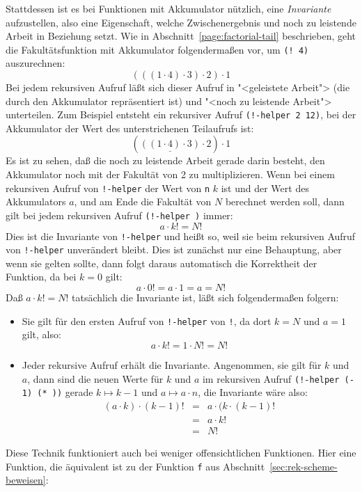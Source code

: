 Stattdessen ist es bei Funktionen mit Akkumulator nützlich, eine
\textit{Invariante} aufzustellen, also eine
Eigenschaft, welche Zwischenergebnis und noch zu leistende Arbeit in
Beziehung setzt.  Wie in Abschnitt~\ref{page:factorial-tail}
beschrieben, geht die Fakultätsfunktion mit Akkumulator folgendermaßen
vor, um \texttt{(! 4)} auszurechnen:
%
\begin{displaymath}
  (((1 \cdot 4)\cdot 3)\cdot 2)\cdot 1
\end{displaymath}
%
Bei jedem rekursiven Aufruf läßt sich dieser Aufruf in "<geleistete
Arbeit"> (die durch den Akkumulator repräsentiert ist) und "<noch zu
leistende Arbeit"> unterteilen.  Zum Beispiel entsteht ein rekursiver
Aufruf \texttt{(!-helper 2 12)}, bei der Akkumulator der Wert des
unterstrichenen Teilaufrufs ist:
%
\begin{displaymath}
  (\underline{((1 \cdot 4)\cdot 3)}\cdot 2)\cdot 1
\end{displaymath}
%
Es ist zu sehen, daß die noch zu leistende Arbeit gerade darin
besteht, den Akkumulator noch mit der Fakultät von 2 zu
multiplizieren.  Wenn bei einem rekursiven Aufruf von \texttt{!-helper} der
Wert von \texttt{n} $k$ ist und der Wert des Akkumulators $a$, und am
Ende die Fakultät von $N$ berechnet werden soll, dann gilt bei jedem
rekursiven Aufruf \texttt{(!-helper  )} immer:
%
\begin{displaymath}
  a \cdot k! = N!
\end{displaymath}
%
Dies ist die Invariante von \texttt{!-helper} und heißt so, weil sie beim
rekursiven Aufruf von \texttt{!-helper} unverändert bleibt.  Dies
ist zunächst nur eine Behauptung, aber wenn sie gelten sollte, dann
folgt daraus automatisch die Korrektheit der Funktion, da bei $k=0$
gilt:
%
\begin{displaymath}
  a \cdot 0! = a \cdot 1 = a = N!
\end{displaymath}
%
Daß $a \cdot k! = N!$ tatsächlich die Invariante ist, läßt sich
folgendermaßen folgern:
%
\begin{itemize}
\item Sie gilt für den ersten Aufruf von \texttt{!-helper} von
  \texttt{!}, da dort $k=N$ und $a=1$ gilt, also:
  \begin{displaymath}
    a \cdot k! = 1 \cdot N! = N!
  \end{displaymath}
\item Jeder rekursive Aufruf erhält die Invariante.  Angenommen, sie
  gilt für $k$ und $a$, dann sind die neuen Werte für $k$ und $a$ im
  rekursiven Aufruf \texttt{(!-helper (-  1) (*  ))} gerade
  $k\mapsto k-1$ und $a \mapsto a\cdot n$, die Invariante wäre also:
  \begin{eqnarray*}
    (a \cdot k) \cdot (k-1)! &=& a \cdot (k \cdot (k-1)!\\
    &=& a\cdot k!\\
    &=& N!
  \end{eqnarray*}
\end{itemize}
%
Diese Technik funktioniert auch bei weniger offensichtlichen
Funktionen.  Hier eine Funktion, die äquivalent ist zu der Funktion
\texttt{f} aus Abschnitt~\ref{sec:rek-scheme-beweisen}:

